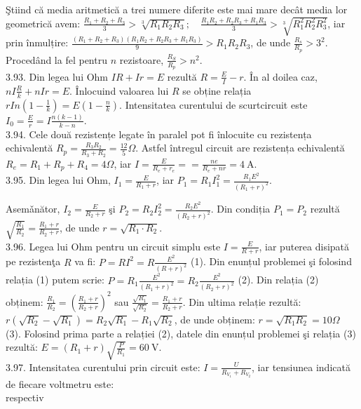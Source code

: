 \documentclass[10pt]{article}
\begin{document}
Ştiind că media aritmetică a trei numere diferite este mai mare decât media lor geometrică avem: $\frac{R_{1}+R_{2}+R_{3}}{3}>\sqrt[3]{R_{1} R_{2} R_{3}} ; \quad \frac{R_{1} R_{2}+R_{2} R_{3}+R_{1} R_{3}}{3}>\sqrt[3]{R_{1}^{2} R_{2}^{2} R_{3}^{2}}$, iar prin înmulțire: $\frac{\left(R_{1}+R_{2}+R_{3}\right)\left(R_{1} R_{2}+R_{2} R_{3}+R_{1} R_{3}\right)}{9}>R_{1} R_{2} R_{3}$, de unde $\frac{R_{s}}{R_{p}}>3^{2}$. Procedând la fel pentru $n$ rezistoare, $\frac{R_{S}}{R_{p}}>n^{2}$.\\
3.93. Din legea lui Ohm $I R+I r=E$ rezultă $R=\frac{E}{I}-r$. În al doilea caz, $n I \frac{R}{k}+n I r=E$. Înlocuind valoarea lui $R$ se obține relația $r I n\left(1-\frac{1}{k}\right)=E\left(1-\frac{n}{k}\right)$. Intensitatea curentului de scurtcircuit este $I_{0}=\frac{E}{r}=I \frac{n(k-1)}{k-n}$.\\
3.94. Cele două rezistențe legate în paralel pot fi înlocuite cu rezistența echivalentă $R_{p}=\frac{R_{3} R_{2}}{R_{3}+R_{2}}=\frac{12}{5} \Omega$. Astfel întregul circuit are rezistența echivalentă $R_{e}=R_{1}+R_{p}+R_{4}=4 \Omega$, iar $I=\frac{E}{R_{e}+r_{e}}==\frac{n e}{R_{e}+n r}=4 \mathrm{~A}$.\\
3.95. Din legea lui Ohm, $I_{1}=\frac{E}{R_{1}+r}$, iar $P_{1}=R_{1} I_{1}^{2}=\frac{R_{1} E^{2}}{\left(R_{1}+r\right)^{2}}$.

Asemǎnător, $I_{2}=\frac{E}{R_{2}+r}$ şi $P_{2}=R_{2} I_{2}^{2}=\frac{R_{2} E^{2}}{\left(R_{2}+r\right)^{2}}$. Din condiția $P_{1}=P_{2}$ rezultă $\sqrt{\frac{R_{1}}{R_{2}}}=\frac{R_{1}+r}{R_{2}+r}$, de unde $r=\sqrt{R_{1} \cdot R_{2}}$.\\
3.96. Legea lui Ohm pentru un circuit simplu este $I=\frac{E}{R+r}$, iar puterea disipată pe rezistenţa $R$ va fi: $P=R I^{2}=R \frac{E^{2}}{(R+r)^{2}}$ (1). Din enunțul problemei şi folosind relația (1) putem scrie: $P=R_{1} \frac{E^{2}}{\left(R_{1}+r\right)^{2}}=R_{2} \frac{E^{2}}{\left(R_{2}+r\right)^{2}}$ (2). Din relația (2) obținem: $\frac{R_{1}}{R_{2}}=\left(\frac{R_{1}+r}{R_{2}+r}\right)^{2}$ sau $\frac{\sqrt{R_{1}}}{\sqrt{R_{2}}}=\frac{R_{1}+r}{R_{2}+r}$. Din ultima relație rezultă: $r\left(\sqrt{R_{2}}-\sqrt{R_{1}}\right)=R_{2} \sqrt{R_{1}}-R_{1} \sqrt{R_{2}}$, de unde obținem: $r=\sqrt{R_{1} R_{2}}=10 \Omega \quad$ (3). Folosind prima parte a relației (2), datele din enunțul problemei şi relația (3) rezultă: $E=\left(R_{1}+r\right) \sqrt{\frac{P}{R_{1}}}=60 \mathrm{~V}$.\\
3.97. Intensitatea curentului prin circuit este: $I=\frac{U}{R_{V_{1}}+R_{V_{2}}}$, iar tensiunea indicată de fiecare voltmetru este:\\
respectiv
\end{document}
